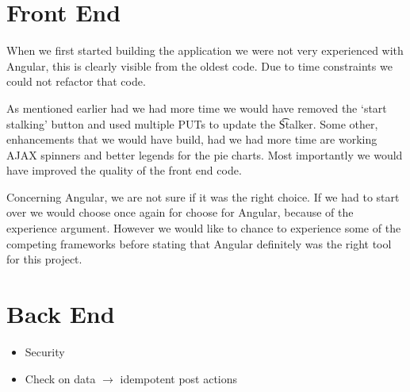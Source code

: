 
\section{Front End}
	When we first started building the application we were not very experienced with Angular, this is clearly visible from the oldest code. Due to time constraints we could not refactor that code. 

	As mentioned earlier had we had more time we would have removed the `start stalking' button and  used multiple PUTs to update the \t{Stalker}. Some other, enhancements that we would have build, had we had more time are working AJAX spinners and better legends for the pie charts. Most importantly we would have improved the quality of the front end code. 

	Concerning Angular, we are not sure if it was the right choice. If we had to start over we would choose once again for choose for Angular, because of the experience argument. However we would like to chance to experience some of the competing frameworks before stating that Angular definitely was the right tool for this project.

\section{Back End}


\begin{itemize}
\item Security
\item Check on data $\rightarrow$ idempotent post actions  
\end{itemize}